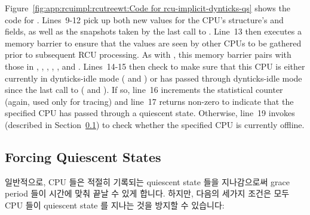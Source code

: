 Figure~\ref{fig:app:rcuimpl:rcutreewt:Code for rcu-implicit-dynticks-qs}
shows the code for .
Lines~9-12 pick up both new values for the CPU's 
structure's  and  fields, as well
as the snapshots taken by the last call to
.
Line~13 then executes a memory barrier to ensure that the values are
seen by other CPUs to be gathered prior to subsequent RCU processing.
As with , this memory barrier
pairs with those in ,
, , ,
, and .
Lines~14-15 then check to make sure that this CPU is either currently
in dynticks-idle mode ( and
) or has passed through dynticks-idle mode
since the last call to 
( and ).
If so, line~16 increments the  statistical
counter (again, used only for tracing) and line~17 returns non-zero
to indicate that the specified CPU has passed through a quiescent state.
Otherwise, line~19 invokes 
(described in Section~\ref{app:rcuimpl:rcutreewt:Forcing Quiescent States})
to check whether the specified CPU is currently offline.
\fi

\subsection{Forcing Quiescent States}
\label{app:rcuimpl:rcutreewt:Forcing Quiescent States}

일반적으로, CPU 들은 적절히 기록되는 quiescent state 들을 지나감으로써 grace
period 들이 시간에 맞춰 끝날 수 있게 합니다.
하지만, 다음의 세가지 조건은 모두 CPU 들이 quiescent state 를 지나는 것을
방지할 수 있습니다:
\iffalse

Normally, CPUs pass through quiescent states which are duly recorded,
so that grace periods end in a timely manner.
However, any of the following three conditions can prevent CPUs from
passing through quiescent states:
\fi

